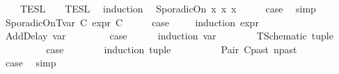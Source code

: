 \begin{isabellebody}
\ \ {\isacartoucheopen}{\isasymlbrakk}\ {\isasymphi}\ {\isasymrbrakk}\isactrlsub T\isactrlsub E\isactrlsub S\isactrlsub L\ {\isacharequal}\ {\isasymlbrakk}\ {\isasymphi}\ {\isasymrbrakk}\isactrlsub T\isactrlsub E\isactrlsub S\isactrlsub L\isactrlbsup {\isasymge}\ {}\isactrlesup {\isacartoucheclose}\isanewline
%
\isadelimproof
%
\endisadelimproof
%
\isatagproof
{}\isamarkupfalse%
\ {\isacharparenleft}induction\ {\isasymphi}{\isacharparenright}\isanewline
{}\isamarkupfalse%
\ {\isacharparenleft}SporadicOn\ x{}\ x{}\ x{}{\isacharparenright}\isanewline
\ \ \isamarkupfalse%
\ \isamarkupfalse%
\ {\isacharquery}case\ \isamarkupfalse%
\ simp\isanewline
{}\isamarkupfalse%
\isanewline
\ \ \isamarkupfalse%
\ {\isacharparenleft}SporadicOnTvar\ C\ {\isasymtau}\isactrlsub e\isactrlsub x\isactrlsub p\isactrlsub r\ C\isanewline
\ \ \isamarkupfalse%
\ \isamarkupfalse%
\ {\isacharquery}case\ \isanewline
\ \ \isamarkupfalse%
\ {\isacharparenleft}induction\ {\isasymtau}\isactrlsub e\isactrlsub x\isactrlsub p\isactrlsub r{\isacharparenright}\isanewline
\ \ \ \ \isamarkupfalse%
\ {\isacharparenleft}AddDelay\ {\isasymtau}\isactrlsub v\isactrlsub a\isactrlsub r\ {\isasymdelta}{\isasymtau}{\isacharparenright}\isanewline
\ \ \ \ \isamarkupfalse%
\ \isamarkupfalse%
\ {\isacharquery}case\isanewline
\ \ \ \ \isamarkupfalse%
\ {\isacharparenleft}induction\ {\isasymtau}\isactrlsub v\isactrlsub a\isactrlsub r\isanewline
\ \ \ \ \ \ \isamarkupfalse%
\ {\isacharparenleft}TSchematic\ tuple{\isacharparenright}\isanewline
\ \ \ \ \ \ \isamarkupfalse%
\ \isamarkupfalse%
\ {\isacharquery}case\isanewline
\ \ \ \ \ \ \isamarkupfalse%
\ {\isacharparenleft}induction\ tuple{\isacharparenright}\isanewline
\ \ \ \ \ \ \ \ \isamarkupfalse%
\ {\isacharparenleft}Pair\ C\isactrlsub p\isactrlsub a\isactrlsub s\isactrlsub t\ n\isactrlsub p\isactrlsub a\isactrlsub s\isactrlsub t{\isacharparenright}\isanewline
\ \ \ \ \ \ \ \ \isamarkupfalse%
\ \isamarkupfalse%
\ {\isacharquery}case\ \isamarkupfalse%
\ simp\isanewline
\ \ \ \ \ \ \isamarkupfalse%

\end{isabellebody}
